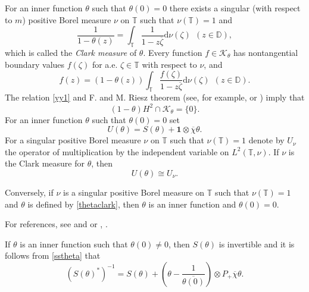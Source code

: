 \documentclass[a4paper,oneside,11pt]{amsart}
\numberwithin{equation}{section}
\theoremstyle{plain}
\theoremstyle{definition}
\begin{document}
For an inner function $\theta$ such that $\theta(0)=0$ 
there exists a singular (with respect to $m$) positive Borel  measure $\nu$ on $\mathbb T$ such that $\nu(\mathbb T)=1$ and 
\begin{equation}
\label{thetaclark}
\frac{1}{1-\theta(z)}=\int_{\mathbb T}\frac{1}{1-z\overline\zeta}\mathrm{d}\nu(\zeta)  \ \ (z\in\mathbb D),\end{equation}
which is called the \emph{Clark measure} of $\theta$. 
Every function $f\in\mathcal K_\theta$ has nontangential boundary values $f(\zeta)$ for 
a.e. $\zeta\in\mathbb T$ with respect to $\nu$, and 
\begin{equation}
\label{yy1}
 f(z)=(1-\theta(z))\int_{\mathbb T}\frac{f(\zeta)}{1-z\overline\zeta}\mathrm{d}\nu(\zeta)  \ \ (z\in\mathbb D).
\end{equation}
The relation \eqref{yy1} and F. and M. Riesz theorem (see, for example, {\cite[Theorem 1.21]{gmr}}
 or {\cite[Theorem II.3.8]{garnett}}) imply that 
\begin{equation}\label{31} (1-\theta)H^2\cap\mathcal K_\theta=\{0\}. \end{equation}
For an inner function $\theta$ such that $\theta(0)=0$ set 
\begin{equation}
\label{uutheta}
U(\theta)=S(\theta)+\mathbf{1}\otimes\overline\chi\theta.
\end{equation}
For a  singular positive Borel  measure $\nu$ on $\mathbb T$ such that $\nu(\mathbb T)=1$ denote by $U_\nu$ 
the operator of multiplication by the independent variable on $L^2(\mathbb T, \nu)$. If $\nu$ is 
the Clark measure for $\theta$, then 
\begin{equation}
\label{thetanucong}
U(\theta)\cong U_\nu.
\end{equation}

Conversely, if $\nu$ is a singular positive Borel  measure on 
$\mathbb T$ such that $\nu(\mathbb T)=1$ and $\theta$ is defined by \eqref{thetaclark}, 
then $\theta$ is an inner function and $\theta(0)=0$. 

For references,  see \cite{clark} and \cite{polt} or \cite{garciaross15}, \cite{gmr}.

If $\theta$ is an inner function such that $\theta(0)\neq 0$, then $S(\theta)$ is invertible and 
it is follows from \eqref{sstheta} that 
\begin{equation}\label{ssthetainv} (S(\theta)^*)^{-1}=S(\theta)+(\theta-\frac{1}{\overline{\theta(0)}})\otimes P_+\overline\chi\theta.
\end{equation}
\end{document}
